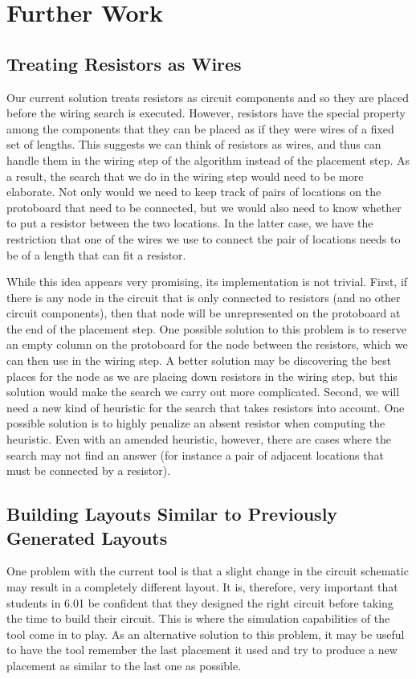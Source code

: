 \section{Further Work}

\subsection{Treating Resistors as Wires}

Our current solution treats resistors as circuit components and so they are
placed before the wiring search is executed.
However, resistors have the special property among the components that
they can be placed as if they were wires of a fixed set of lengths.
This suggests we can think of resistors as wires,
and thus can handle them in the wiring step of the algorithm instead of
the placement step. As a result, the search that we do in the wiring step would
need to be
more elaborate. Not only would we need to keep track of pairs of locations on the
protoboard that need to be connected, but we would also need to know whether to
put a resistor between the two locations. In the latter case, we have the
restriction that one of the wires we use to connect the pair of locations needs
to be of a length that can fit a resistor.

While this idea appears very promising, its implementation is not trivial.
First, if there is any node in the circuit that is only
connected to resistors (and no other circuit components), then that node will be
unrepresented on the protoboard at the end of the placement step. One possible
solution to this problem is to reserve an empty column on the
protoboard for the node between the resistors, which we can then use in the
wiring step. A better solution may
be discovering the best places for the node as we are placing down resistors in
the wiring step, but this solution would make the search we carry out
more complicated. Second, we will need a new kind of heuristic for the
search that takes resistors into account. One possible solution is to highly
penalize an absent resistor when computing the heuristic.
Even with an amended heuristic, however, there
are cases where the search may not find an answer (for instance a pair of
adjacent locations that must be connected by a resistor).

\subsection{Building Layouts Similar to Previously Generated Layouts}
One problem with the current tool is that a slight change in
the circuit schematic may result in a completely different layout. It is,
therefore, very important that students in 6.01 be confident that they designed
the right circuit before taking the time to build their circuit.
This is where the simulation
capabilities of the tool come in to play. As an alternative solution to this
problem, it may be useful to have the
tool remember the last placement it used and try to produce a new placement as
similar to the last one as possible.

